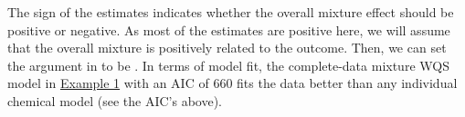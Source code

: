 The sign of the estimates indicates whether the overall mixture effect
should be positive or negative. As most of the estimates are positive
here, we will assume that the overall mixture is positively related to
the outcome. Then, we can set the  argument in
 to be . In terms of model fit, the
complete-data mixture WQS model in \protect\hyperlink{Example-1}{Example
1} with an AIC of 660 fits the data better than any individual chemical
model (see the AIC's above).




\address{%
Paul M. Hargarten\\
Virginia Commonwealth University\\%
One Capitol Square\\ 830 East Main Street Seventh Floor\\ Richmond, Virginia 23219\\
%
%
%
\\\href{mailto:hargartenp@vcu.edu}{\nolinkurl{hargartenp@vcu.edu}}
}

\address{%
David C. Wheeler\\
Virginia Commonwealth University\\%
One Capitol Square\\ 830 East Main Street Seventh Floor\\ Richmond, Virginia 23219\\
%
%
%
\\\href{mailto:david.wheeler@vcuhealth.org}{\nolinkurl{david.wheeler@vcuhealth.org}}
}

